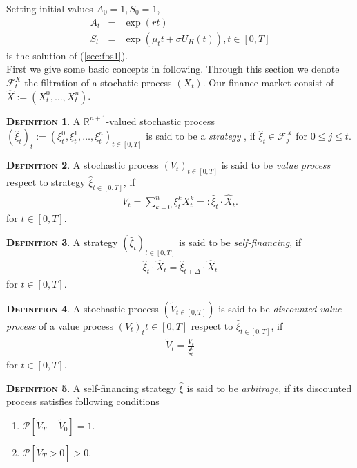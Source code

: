 \documentclass[a4paper, twoside, 11pt]{article}
\theoremstyle{definition}
\newtheorem{definition}{\scshape Definition}[section]
\begin{document}
Setting initial values $A_0=1, S_0=1$, 
\begin{eqnarray}
  A_t &=& \exp(rt)\nonumber\\
  S_t &=& \exp(\mu_tt +\sigma U_H(t)), t\in [0, T]
  \label{sec:fbs2}
\end{eqnarray}
is the solution of (\ref{sec:fbs1}). \\
First we give some basic concepts in following. Through this section we denote $\mathcal{F}^X_t$ the filtration of a stochatic process $(X_t)$. Our finance market consist of $\hat{X}:=(X_t^0,\dots, X_t^n)$.

\begin{definition}
  A $\mathbb{R}^{n+1}$-valued stochastic process $(\hat{\xi}_t)_t:=(\xi_t^0, \xi_t^1,\dots, \xi_t^n)_{t\in [0, T]}$ is said to be a \emph{strategy} , if $\hat{\xi}_t \in \mathcal{F}^X_{j}$ for $0\le j \le t$.
\end{definition}

\begin{definition}
  A stochastic process $(V_t)_{t\in[0, T]}$ is said to be \emph{value process} respect to strategy $\hat{\xi}_{t\in [0, T]}$, if 
  \begin{eqnarray*}
	V_t = \sum_{k=0}^n \xi^k_t X^k_t =: \hat{\xi}_t\cdot\hat{X}_t.
  \end{eqnarray*}
  for $t \in [0, T]$.
\end{definition}

\begin{definition}
  A strategy $(\hat{\xi}_t)_{t\in [0, T]}$ is said to be \emph{self-financing}, if 
  \begin{eqnarray*}
	\hat{\xi}_t \cdot \hat{X}_t = \hat{\xi}_{t+\Delta} \cdot \hat{X}_t
  \end{eqnarray*}
  for $t \in [0, T]$.
\end{definition}

\begin{definition}
  A stochastic process $(\tilde{V}_{t\in[0,T]})$ is said to be \emph{discounted value process} of a value process $(V_t)_t{t\in [0, T]}$ respect to $\hat{\xi}_{t\in [0, T]}$, if 
  \begin{eqnarray*}
	\tilde{V}_t = \frac{V_t}{\xi_t^0}
  \end{eqnarray*}
  for $t \in [0, T]$.
\end{definition}

\begin{definition}
  A self-financing strategy $\hat{\xi}$ is said to be \emph{arbitrage}, if its discounted process satisfies following conditions
  \begin{enumerate}[topsep=0pt, itemsep=-1ex, partopsep=1ex, parsep=1ex, label=(\roman*)]
	\item $\mathcal{P}[\tilde{V}_T - \tilde{V}_0]=1$.
	\item $\mathcal{P}[\tilde{V}_T > 0] > 0$.
	\end{enumerate}
  \end{definition}
\end{document}
